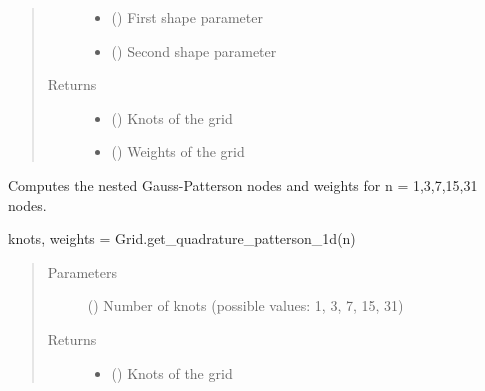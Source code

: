 \documentclass[letterpaper,10pt,english,openany,oneside]{sphinxmanual}
\begin{document}
\begin{fulllineitems}
\begin{fulllineitems}
\begin{quote}
\begin{description}
\begin{itemize}
\item {} 
 () \textendash{} First shape parameter

\item {} 
 () \textendash{} Second shape parameter

\end{itemize}

\item[{Returns}] \leavevmode
\begin{itemize}
\item {} 
 () \textendash{} Knots of the grid

\item {} 
 () \textendash{} Weights of the grid

\end{itemize}


\end{description}\end{quote}

\end{fulllineitems}


\begin{fulllineitems}
\label{\detokenize{pygpc:pygpc.Grid.Grid.get_quadrature_patterson_1d}}
Computes the nested Gauss-Patterson nodes and weights for n = 1,3,7,15,31 nodes.

knots, weights = Grid.get\_quadrature\_patterson\_1d(n)
\begin{quote}\begin{description}
\item[{Parameters}] \leavevmode
{} () \textendash{} Number of knots (possible values: 1, 3, 7, 15, 31)

\item[{Returns}] \leavevmode
\begin{itemize}
\item {} 
 () \textendash{} Knots of the grid


\end{itemize}
\end{description}
\end{quote}
\end{fulllineitems}
\end{fulllineitems}
\end{document}

